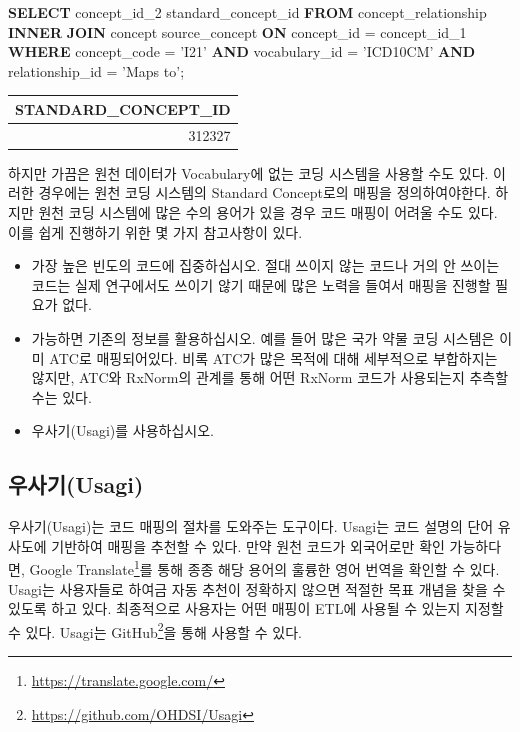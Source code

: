 \documentclass[11pt]{book}
\newenvironment{Shaded}{\begin{snugshade}}{\end{snugshade}}
\newcommand{\KeywordTok}[1]{\textcolor[rgb]{0.13,0.29,0.53}{\textbf{#1}}}
\newcommand{\DecValTok}[1]{\textcolor[rgb]{0.00,0.00,0.81}{#1}}
\newcommand{\StringTok}[1]{\textcolor[rgb]{0.31,0.60,0.02}{#1}}
\newcommand{\NormalTok}[1]{#1}
\providecommand{\tightlist}{%
  \setlength{\itemsep}{0pt}\setlength{\parskip}{0pt}}
\let\rmarkdownfootnote\footnote%
\def\footnote{\protect\rmarkdownfootnote}
\theoremstyle{definition}
\theoremstyle{definition}
\theoremstyle{definition}
\theoremstyle{remark}
\begin{document}
\begin{Shaded}
\begin{Highlighting}[]
\KeywordTok{SELECT}\NormalTok{ concept_id_2 standard_concept_id}
\KeywordTok{FROM}\NormalTok{ concept_relationship}
\KeywordTok{INNER} \KeywordTok{JOIN}\NormalTok{ concept source_concept}
  \KeywordTok{ON}\NormalTok{ concept_id = concept_id_}\DecValTok{1}
\KeywordTok{WHERE}\NormalTok{ concept_code = }\StringTok{'I21'}
  \KeywordTok{AND}\NormalTok{ vocabulary_id = }\StringTok{'ICD10CM'}
  \KeywordTok{AND}\NormalTok{ relationship_id = }\StringTok{'Maps to'}\NormalTok{; }
\end{Highlighting}
\end{Shaded}

\begin{longtable}[]{@{}r@{}}
\toprule
STANDARD\_CONCEPT\_ID\tabularnewline
\midrule
\endhead
312327\tabularnewline
\bottomrule
\end{longtable}

하지만 가끔은 원천 데이터가 Vocabulary에 없는 코딩 시스템을 사용할 수도
있다. 이러한 경우에는 원천 코딩 시스템의 Standard Concept로의 매핑을
정의하여야한다. 하지만 원천 코딩 시스템에 많은 수의 용어가 있을 경우
코드 매핑이 어려울 수도 있다. 이를 쉽게 진행하기 위한 몇 가지 참고사항이
있다.

\begin{itemize}
\tightlist
\item
  가장 높은 빈도의 코드에 집중하십시오. 절대 쓰이지 않는 코드나 거의 안
  쓰이는 코드는 실제 연구에서도 쓰이기 않기 때문에 많은 노력을 들여서
  매핑을 진행할 필요가 없다.
\item
  가능하면 기존의 정보를 활용하십시오. 예를 들어 많은 국가 약물 코딩
  시스템은 이미 ATC로 매핑되어있다. 비록 ATC가 많은 목적에 대해
  세부적으로 부합하지는 않지만, ATC와 RxNorm의 관계를 통해 어떤 RxNorm
  코드가 사용되는지 추측할 수는 있다.
\item
  우사기(Usagi)를 사용하십시오.
\end{itemize}

\subsection{우사기(Usagi)}\label{usagi}

우사기(Usagi)는 코드 매핑의 절차를 도와주는 도구이다. Usagi는 코드
설명의 단어 유사도에 기반하여 매핑을 추천할 수 있다. 만약 원천 코드가
외국어로만 확인 가능하다면, Google Translate\footnote{\url{https://translate.google.com/}}를
통해 종종 해당 용어의 훌륭한 영어 번역을 확인할 수 있다. Usagi는
사용자들로 하여금 자동 추천이 정확하지 않으면 적절한 목표 개념을 찾을 수
있도록 하고 있다. 최종적으로 사용자는 어떤 매핑이 ETL에 사용될 수 있는지
지정할 수 있다. Usagi는 GitHub\footnote{\url{https://github.com/OHDSI/Usagi}}을
통해 사용할 수 있다. 
\end{document}
